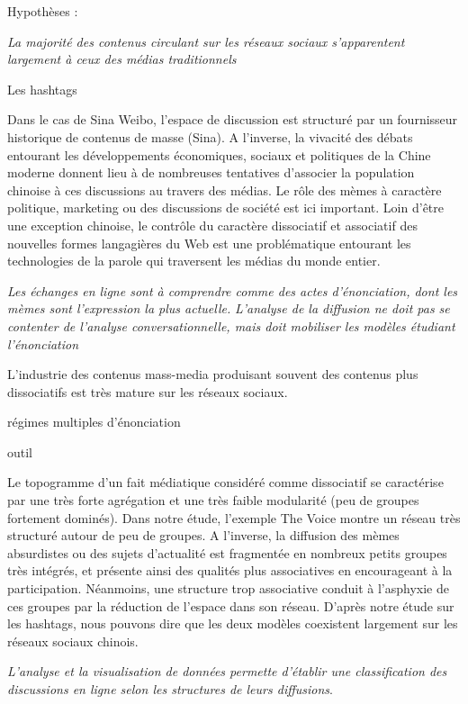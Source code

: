 Hypothèses :

\textit{La majorité des contenus circulant sur les réseaux sociaux s'apparentent largement à ceux des médias traditionnels}

Les hashtags

Dans le cas de Sina Weibo, l’espace de discussion est structuré par un fournisseur historique de contenus de masse (Sina). A l’inverse, la vivacité des débats entourant les développements économiques, sociaux et politiques de la Chine moderne donnent lieu à de nombreuses tentatives d’associer la population chinoise à ces discussions au travers des médias. Le rôle des mèmes à caractère politique, marketing ou des discussions de société est ici important. Loin d’être une exception chinoise, le contrôle du caractère dissociatif et associatif des nouvelles formes langagières du Web est une problématique entourant les technologies de la parole qui traversent les médias du monde entier.


\textit{Les échanges en ligne sont à comprendre comme des actes d'énonciation, dont les mèmes sont l'expression la plus actuelle.}
\textit{L'analyse de la diffusion ne doit pas se contenter de l'analyse conversationnelle, mais doit mobiliser les modèles étudiant l'énonciation} 

L’industrie des contenus mass-media produisant souvent des contenus plus dissociatifs est très mature sur les réseaux sociaux. 

régimes multiples d'énonciation

outil

Le topogramme d’un fait médiatique considéré comme dissociatif se caractérise par une très forte agrégation et une très faible modularité (peu de groupes fortement dominés). Dans notre étude, l’exemple The Voice montre un réseau très structuré autour de peu de groupes. A l’inverse, la diffusion des mèmes absurdistes ou des sujets d’actualité est fragmentée en nombreux petits groupes très intégrés, et présente ainsi des qualités plus associatives en encourageant à la participation. Néanmoins, une structure trop associative conduit à l’asphyxie de ces groupes par la réduction de l’espace dans son réseau. D’après notre étude sur les hashtags, nous pouvons dire que les deux modèles coexistent largement sur les réseaux sociaux chinois. 



\textit{L'analyse et la visualisation de données permette d'établir une classification des discussions en ligne selon les structures de leurs diffusions}.


